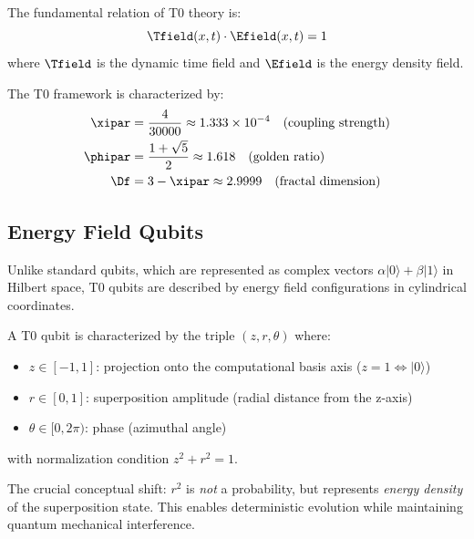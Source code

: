 \begin{definition}
	The fundamental relation of T0 theory is:
	\begin{equation}
		\Tfield(x,t) \cdot \Efield(x,t) = 1
		\label{eq:t0duality}
	\end{equation}
	where $\Tfield$ is the dynamic time field and $\Efield$ is the energy density field.
\end{definition}

\begin{definition}
	The T0 framework is characterized by:
	\begin{align}
		\xipar &= \frac{4}{30000} \approx 1.333 \times 10^{-4} \quad \text{(coupling strength)} \\
		\phipar &= \frac{1 + \sqrt{5}}{2} \approx 1.618 \quad \text{(golden ratio)} \\
		\Df &= 3 - \xipar \approx 2.9999 \quad \text{(fractal dimension)}
	\end{align}
\end{definition}

\subsection{Energy Field Qubits}

Unlike standard qubits, which are represented as complex vectors $\alpha|0\rangle + \beta|1\rangle$ in Hilbert space, T0 qubits are described by energy field configurations in cylindrical coordinates.

\begin{definition}[T0 Qubit]
	A T0 qubit is characterized by the triple $(z, r, \theta)$ where:
	\begin{itemize}
		\item $z \in [-1, 1]$: projection onto the computational basis axis ($z=1 \Leftrightarrow |0\rangle$)
		\item $r \in [0, 1]$: superposition amplitude (radial distance from the z-axis)
		\item $\theta \in [0, 2\pi)$: phase (azimuthal angle)
	\end{itemize}
	with normalization condition $z^2 + r^2 = 1$.
\end{definition}

\begin{remark}
	The crucial conceptual shift: $r^2$ is \emph{not} a probability, but represents \emph{energy density} of the superposition state. This enables deterministic evolution while maintaining quantum mechanical interference.
\end{remark}


